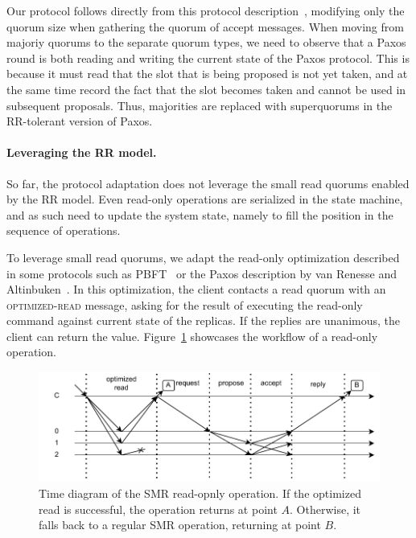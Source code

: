 Our protocol follows directly from this protocol
description~\cite{paxos_builders}, modifying only the quorum size
when gathering the quorum of accept messages. When moving from
majoriy quorums to the separate quorum
types, we need to observe that a Paxos round is both reading and writing
the current state of the Paxos protocol. This is because it must
read that the slot that is being proposed is not yet taken, and
at the same time record the fact that the slot becomes taken and
cannot be used in subsequent proposals. Thus, majorities are
replaced with superquorums in the \ac{RR}-tolerant version of
Paxos.


\paragraph{Leveraging the \ac{RR} model.}
So far, the protocol adaptation does not leverage the
small read quorums enabled by the \ac{RR} model. Even
read-only operations are serialized in the state machine, and as
such need to update the system state, namely to fill the position
in the sequence of operations.

To leverage small read quorums, we adapt the read-only
optimization described in some protocols such as PBFT~\cite{pbft} or
the Paxos description by van Renesse and Altinbuken~\cite{pmmc}.  In
this optimization, the client contacts a read quorum with an
\textsc{optimized-read} message, asking for the
result of executing the read-only command against current state of the
replicas. If the replies are unanimous, the client can return the
value. Figure~\ref{fig:paxos-read} showcases the workflow of a
read-only operation.

\begin{figure}[t]
    \centering
    \includegraphics[width=\linewidth]{img/paxos_read}
    \caption{Time diagram of the \ac{SMR} read-opnly operation. If the
    optimized read is successful, the operation returns at point
    $A$. Otherwise, it falls back to a regular \ac{SMR}
    operation, returning at point $B$.}\label{fig:paxos-read}
\end{figure}

